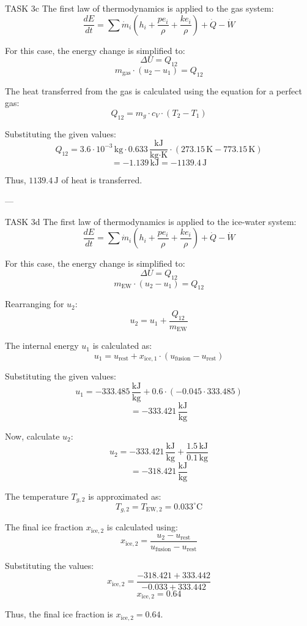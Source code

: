 TASK 3c  
The first law of thermodynamics is applied to the gas system:  
\[
\frac{dE}{dt} = \sum \dot{m}_i \left( h_i + \frac{pe_i}{\rho} + \frac{ke_i}{\rho} \right) + \dot{Q} - \dot{W}
\]  

For this case, the energy change is simplified to:  
\[
\Delta U = Q_{12}
\]  
\[
m_{\text{gas}} \cdot (u_2 - u_1) = Q_{12}
\]  

The heat transferred from the gas is calculated using the equation for a perfect gas:  
\[
Q_{12} = m_g \cdot c_V \cdot (T_2 - T_1)
\]  

Substituting the given values:  
\[
Q_{12} = 3.6 \cdot 10^{-3} \, \text{kg} \cdot 0.633 \, \frac{\text{kJ}}{\text{kg·K}} \cdot (273.15 \, \text{K} - 773.15 \, \text{K})
\]  
\[
= -1.139 \, \text{kJ} = -1139.4 \, \text{J}
\]  

Thus, \( 1139.4 \, \text{J} \) of heat is transferred.  

---

TASK 3d  
The first law of thermodynamics is applied to the ice-water system:  
\[
\frac{dE}{dt} = \sum \dot{m}_i \left( h_i + \frac{pe_i}{\rho} + \frac{ke_i}{\rho} \right) + \dot{Q} - \dot{W}
\]  

For this case, the energy change is simplified to:  
\[
\Delta U = Q_{12}
\]  
\[
m_{\text{EW}} \cdot (u_2 - u_1) = Q_{12}
\]  

Rearranging for \( u_2 \):  
\[
u_2 = u_1 + \frac{Q_{12}}{m_{\text{EW}}}
\]  

The internal energy \( u_1 \) is calculated as:  
\[
u_1 = u_{\text{rest}} + x_{\text{ice},1} \cdot (u_{\text{fusion}} - u_{\text{rest}})
\]  

Substituting the given values:  
\[
u_1 = -333.485 \, \frac{\text{kJ}}{\text{kg}} + 0.6 \cdot (-0.045 \cdot 333.485)
\]  
\[
= -333.421 \, \frac{\text{kJ}}{\text{kg}}
\]  

Now, calculate \( u_2 \):  
\[
u_2 = -333.421 \, \frac{\text{kJ}}{\text{kg}} + \frac{1.5 \, \text{kJ}}{0.1 \, \text{kg}}
\]  
\[
= -318.421 \, \frac{\text{kJ}}{\text{kg}}
\]  

The temperature \( T_{g,2} \) is approximated as:  
\[
T_{g,2} = T_{\text{EW},2} = 0.033^\circ\text{C}
\]  

The final ice fraction \( x_{\text{ice},2} \) is calculated using:  
\[
x_{\text{ice},2} = \frac{u_2 - u_{\text{rest}}}{u_{\text{fusion}} - u_{\text{rest}}}
\]  

Substituting the values:  
\[
x_{\text{ice},2} = \frac{-318.421 + 333.442}{-0.033 + 333.442}
\]  
\[
x_{\text{ice},2} = 0.64
\]  

Thus, the final ice fraction is \( x_{\text{ice},2} = 0.64 \).